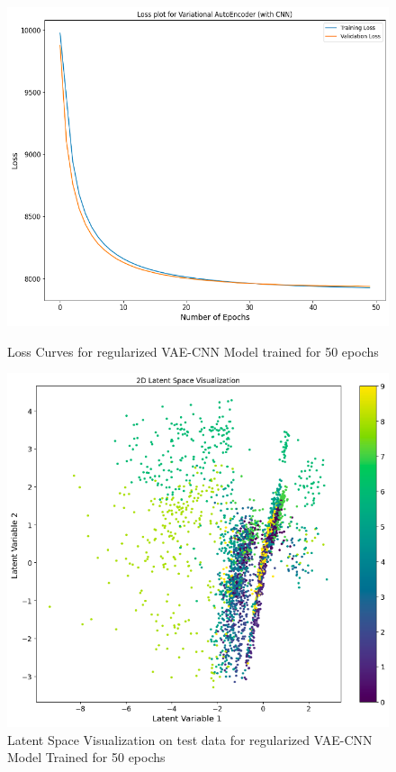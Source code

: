 \documentclass[12pt]{article}
\begin{document}
\begin{figure}[htbp]
    \centering
    \begin{minipage}[b]{0.45\linewidth}
        \centering
        \includegraphics[width=\linewidth]{100cr.png}
        \caption{Loss Curves for regularized VAE-CNN Model trained for 50 epochs}
        \label{fig:gen_stft}
    \end{minipage}
    \hfill
    \begin{minipage}[b]{0.45\linewidth}
        \centering
        \includegraphics[width=\linewidth]{latcr.png}
        \caption{Latent Space Visualization on test data for regularized VAE-CNN Model Trained for 50 epochs}
        \label{fig:generated_audio}
    \end{minipage}
\end{figure}
\end{document}

